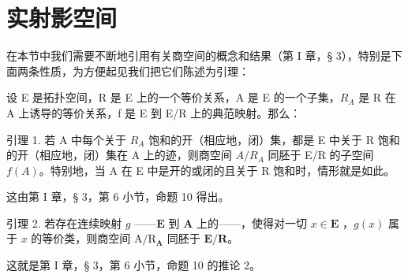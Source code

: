 \section{实射影空间}

在本节中我们需要不断地引用有关商空间的概念和结果（第 I 章，§ 3），特别是下面两条性质，为方便起见我们把它们陈述为引理：

设 E 是拓扑空间，R 是 E 上的一个等价关系，A 是 E 的一个子集，\(R_{A}\) 是 R 在 A 上诱导的等价关系，f 是 E 到 E/R 上的典范映射。那么：

引理 1. 若 A 中每个关于 \(R_{A}\) 饱和的开（相应地，闭）集，都是 E 中关于 R 饱和的开（相应地，闭）集在 A 上的迹，则商空间 \(A/R_{A}\) 同胚于 E/R 的子空间 \(f(A)\)。特别地，当 A 在 E 中是开的或闭的且关于 R 饱和时，情形就是如此。

这由第 I 章，§ 3，第 6 小节，命题 10 得出。

引理 2. 若存在连续映射 \(g\) ——\(\mathbf{E}\) 到 \(\mathbf{A}\) 上的——，使得对一切 \(x \in \mathbf{E}\) ，\(g(x)\) 属于 \(x\) 的等价类，则商空间 \(\mathrm{A} / \mathrm{R}_{\mathbf{A}}\) 同胚于 \(\mathbf{E} / \mathbf{R}\)。

这就是第 I 章，§ 3，第 6 小节，命题 10 的推论 2。

